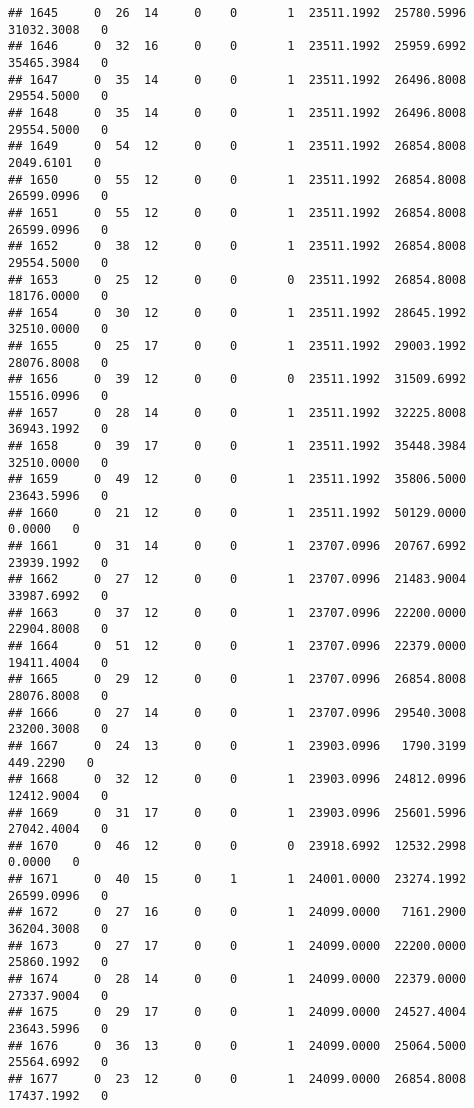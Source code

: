 \documentclass[
]{article}
\begin{document}
\begin{enumerate}
\begin{verbatim}
## 1645     0  26  14     0    0       1  23511.1992  25780.5996  31032.3008   0
## 1646     0  32  16     0    0       1  23511.1992  25959.6992  35465.3984   0
## 1647     0  35  14     0    0       1  23511.1992  26496.8008  29554.5000   0
## 1648     0  35  14     0    0       1  23511.1992  26496.8008  29554.5000   0
## 1649     0  54  12     0    0       1  23511.1992  26854.8008   2049.6101   0
## 1650     0  55  12     0    0       1  23511.1992  26854.8008  26599.0996   0
## 1651     0  55  12     0    0       1  23511.1992  26854.8008  26599.0996   0
## 1652     0  38  12     0    0       1  23511.1992  26854.8008  29554.5000   0
## 1653     0  25  12     0    0       0  23511.1992  26854.8008  18176.0000   0
## 1654     0  30  12     0    0       1  23511.1992  28645.1992  32510.0000   0
## 1655     0  25  17     0    0       1  23511.1992  29003.1992  28076.8008   0
## 1656     0  39  12     0    0       0  23511.1992  31509.6992  15516.0996   0
## 1657     0  28  14     0    0       1  23511.1992  32225.8008  36943.1992   0
## 1658     0  39  17     0    0       1  23511.1992  35448.3984  32510.0000   0
## 1659     0  49  12     0    0       1  23511.1992  35806.5000  23643.5996   0
## 1660     0  21  12     0    0       1  23511.1992  50129.0000      0.0000   0
## 1661     0  31  14     0    0       1  23707.0996  20767.6992  23939.1992   0
## 1662     0  27  12     0    0       1  23707.0996  21483.9004  33987.6992   0
## 1663     0  37  12     0    0       1  23707.0996  22200.0000  22904.8008   0
## 1664     0  51  12     0    0       1  23707.0996  22379.0000  19411.4004   0
## 1665     0  29  12     0    0       1  23707.0996  26854.8008  28076.8008   0
## 1666     0  27  14     0    0       1  23707.0996  29540.3008  23200.3008   0
## 1667     0  24  13     0    0       1  23903.0996   1790.3199    449.2290   0
## 1668     0  32  12     0    0       1  23903.0996  24812.0996  12412.9004   0
## 1669     0  31  17     0    0       1  23903.0996  25601.5996  27042.4004   0
## 1670     0  46  12     0    0       0  23918.6992  12532.2998      0.0000   0
## 1671     0  40  15     0    1       1  24001.0000  23274.1992  26599.0996   0
## 1672     0  27  16     0    0       1  24099.0000   7161.2900  36204.3008   0
## 1673     0  27  17     0    0       1  24099.0000  22200.0000  25860.1992   0
## 1674     0  28  14     0    0       1  24099.0000  22379.0000  27337.9004   0
## 1675     0  29  17     0    0       1  24099.0000  24527.4004  23643.5996   0
## 1676     0  36  13     0    0       1  24099.0000  25064.5000  25564.6992   0
## 1677     0  23  12     0    0       1  24099.0000  26854.8008  17437.1992   0

\end{verbatim}
\end{enumerate}
\end{document}
